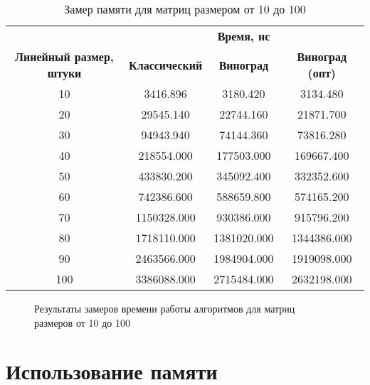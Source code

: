 \begin{table}[ht]
	\small
	\begin{center}
		\begin{threeparttable}
			\caption{Замер памяти для матриц размером от 10 до 100}
			\label{tbl:time}
			\begin{tabular}{|c|c|c|c|}
				\hline
				& \multicolumn{3}{c|}{\bfseries Время, нс} \\ \cline{2-4}
				\bfseries Линейный размер, штуки & \bfseries Классический & \bfseries Виноград & \bfseries Виноград (опт)  \\ \cline{2-4}
				\hline
				10 & 3416.896 & 3180.420 & 3134.480  \\
				\hline
				20 & 29545.140 & 22744.160 & 21871.700  \\
				\hline
				30 & 94943.940 & 74144.360 & 73816.280  \\
				\hline
				40 & 218554.000 & 177503.000 & 169667.400 \\
				\hline
				50 & 433830.200 & 345092.400 & 332352.600 \\
				\hline
				60 &  742386.600 & 588659.800 & 574165.200  \\
				\hline
				70 & 1150328.000 & 930386.000 & 915796.200  \\
				\hline
				80 & 1718110.000 & 1381020.000 & 1344386.000  \\
				\hline
				90 & 2463566.000 & 1984904.000 & 1919098.000  \\
				\hline
				100 & 3386088.000 & 2715484.000 & 2632198.000  \\
				\hline
			\end{tabular}	
		\end{threeparttable}
	\end{center}
\end{table}

\clearpage

\begin{figure}[h]
	\centering
	
	\caption{Результаты замеров времени работы алгоритмов для матриц размеров от 10 до 100}
	\label{img:linear_graph_time}
\end{figure}




\clearpage


\section{Использование памяти}

